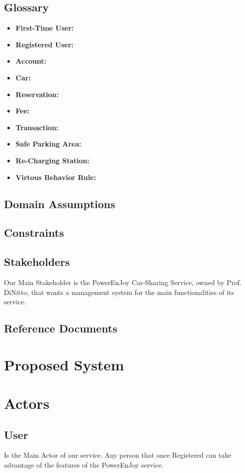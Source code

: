 \documentclass[a4paper]{article}
\begin{document}
\subsection{Glossary}
\begin{itemize}
\item \textbf{First-Time User:}
\item \textbf{Registered User:} 
\item \textbf{Account:} 
\item \textbf{Car:} 
\item \textbf{Reservation:} 
\item \textbf{Fee:} 
\item \textbf{Transaction:} 
\item \textbf{Safe Parking Area:} 
\item \textbf{Re-Charging Station:} 
\item \textbf{Virtous Behavior Rule:} 
\end{itemize}
\subsection{Domain Assumptions}
\subsection{Constraints}
\subsection{Stakeholders}
Our Main Stakeholder is the PowerEnJoy Car-Sharing Service, owned by Prof. DiNitto, that wants a management system for the main functionalities of its service.
\subsection{Reference Documents}

\section{Proposed System}
\newpage

\section{Actors}
\subsection{User}
Is the Main Actor of our service. Any person that once Registered can take advantage of the features of the PowerEnJoy service.
\end{document}
